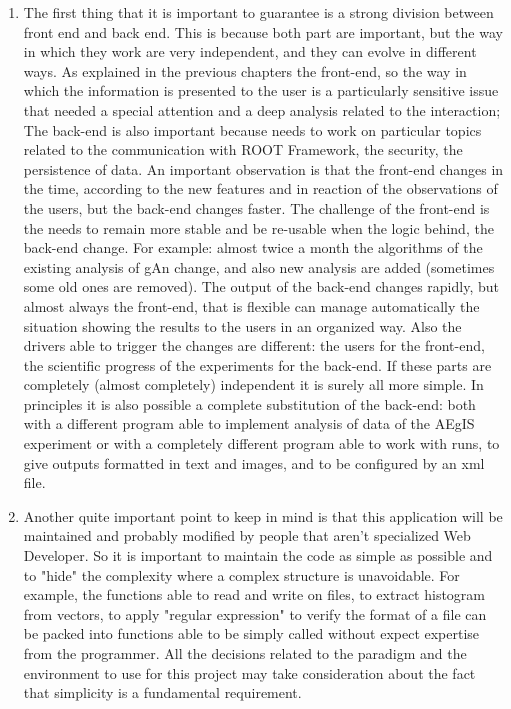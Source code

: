 \begin{enumerate}

\item
The first thing that it is important to guarantee is a strong division between front end and back end. This is because both part are important, but the way in which they work are very independent, and they can evolve in different ways.
As explained in the previous chapters the front-end, so the way in which the information is presented to the user is a particularly sensitive issue that needed a special attention and a deep analysis related to the interaction; The back-end is also important because needs to work on particular topics related to the communication with ROOT Framework, the security, the persistence of data. An important observation is that the front-end changes in the time, according to the new features and in reaction of the observations of the users, but the back-end changes faster. The challenge of the front-end is the needs to remain more stable and be re-usable when the logic behind, the back-end change. For example: almost twice a month the algorithms of the existing analysis of gAn change, and also new analysis are added (sometimes some old ones are removed). The output of the back-end changes rapidly, but almost always the front-end, that is flexible can manage automatically the situation showing the results to the users in an organized way. Also the drivers able to trigger the changes are different: the users for the front-end, the scientific progress of the experiments for the back-end. If these parts are completely (almost completely) independent it is surely all more simple. In principles it is also possible a complete substitution of the back-end: both with a different program able to implement analysis of data of the AEgIS experiment or with a completely different program able to work with runs, to give outputs formatted in text and images, and to be configured by an xml file.

\item
Another quite important point to keep in mind is that this application will be maintained and probably modified by people that aren't specialized Web Developer. So it is important to maintain the code as simple as possible and to "hide" the complexity where a complex structure is unavoidable. For example, the functions able to read and write on files, to extract histogram from vectors, to apply "regular expression" to verify the format of a file can be packed into functions able to be simply called without expect expertise from the programmer. All the decisions related to the paradigm and the environment to use for this project may take consideration about the fact that simplicity is a fundamental requirement.   


\end{enumerate}
